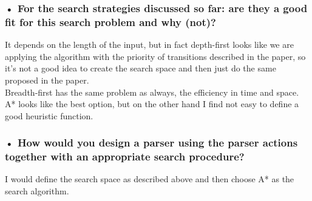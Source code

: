 \documentclass[paper=a4, fontsize=11pt]{scrartcl} %
\numberwithin{equation}{section} %
\numberwithin{figure}{section} %
\numberwithin{table}{section} %
\begin{document}
\subsubsection*{• For the search strategies discussed so far: are they a good fit for this search problem and why (not)?}
It depends on the length of the input, but in fact depth-first looks like we are applying the algorithm with the priority of transitions described in the paper, so it's not a good idea to create the search space and then just do the same proposed in the paper.\\

Breadth-first has the same problem as always, the efficiency in time and space.\\

A* looks like the best option, but on the other hand I find not easy to define a good heuristic function.

\subsubsection*{• How would you design a parser using the parser actions together with an appropriate search procedure?}
I would define the search space as described above and then choose A* as the search algorithm.


\newpage

\end{document}
